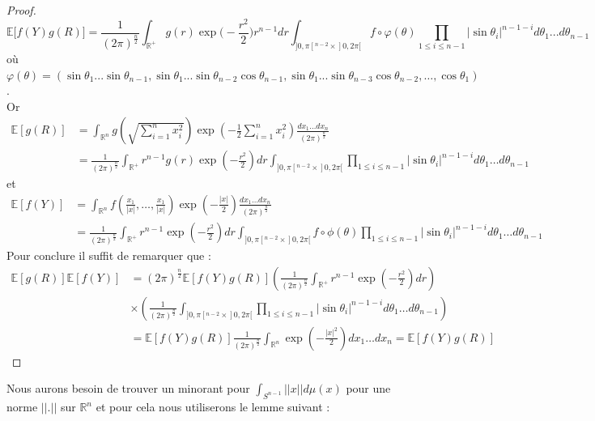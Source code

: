 \documentclass[12pt]{article}
\theoremstyle{definition}
\begin{document}
\begin{proof}
	\begin{equation*}
		\mathbb{E}\big[f(Y)g(R)\big]=\frac{1}{(2\pi)^\frac{n}{2}}\int_{\mathbb{R}^{+}}g(r) \exp\Big(-\frac{r^2}{2}\Big) r^{n-1}dr\int_{]0,\pi[^{n-2}\times ]0,2\pi[} f\circ\varphi(\theta)\prod_{1\leq i\leq n-1}|\sin\theta_i|^{n-1-i}d\theta_1 ... d\theta_{n-1}
	\end{equation*}
	où $\varphi(\theta)=(\sin \theta_1 ... \sin \theta_{n-1},\sin \theta_1 ...\sin \theta_{n-2}\cos \theta_{n-1},\sin \theta_1 ...\sin \theta_{n-3}\cos \theta_{n-2},\dots,\cos \theta_1)$.\\
	Or \begin{align*}
		\mathbb{E}[g(R)] &= \int_{\mathbb{R}^n} g\left(\sqrt{\sum_{i=1}^n x_i^2}\right) \exp\left(-\frac{1}{2}\sum_{i=1}^n x_i^2\right)\frac{dx_1\dots dx_n}{(2\pi)^\frac{n}{2}}\\
		&= \frac{1}{(2\pi)^\frac{n}{2}}\int_{\mathbb{R}^+}r^{n-1} g(r) \exp\left(-\frac{r^2}{2}\right) dr \int_{]0,\pi[^{n-2}\times ]0,2\pi[}\prod_{1\leq i\leq n-1}|\sin\theta_i|^{n-1-i}d\theta_1\dots d\theta_{n-1} 
		\end{align*} 
	et \begin{align*}
		\mathbb{E}[f(Y)] &= \int_{\mathbb{R}^n} f\left(\frac{x_1}{|x|},\dots,\frac{x_1}{|x|}\right) \exp\left(-\frac{|x|}{2}\right) \frac{dx_1\dots dx_n}{(2\pi)^\frac{n}{2}}\\
		&=  \frac{1}{(2\pi)^\frac{n}{2}}\int_{\mathbb{R}^+}r^{n-1} \exp\left(-\frac{r^2}{2}\right) dr \int_{]0,\pi[^{n-2}\times ]0,2\pi[}f\circ\phi(\theta)\prod_{1\leq i\leq n-1}|\sin\theta_i|^{n-1-i}d\theta_1\dots d\theta_{n-1} 
	\end{align*}
	Pour conclure il suffit de remarquer que :
	\begin{align*}
		\mathbb{E}[g(R)]\mathbb{E}[f(Y)] &= (2\pi)^\frac{n}{2}\mathbb{E}[f(Y)g(R)] \left(\frac{1}{(2\pi)^\frac{n}{2}}	\int_{\mathbb{R}^+}r^{n-1} \exp\left(-\frac{r^2}{2}\right) dr \right)\\ &\times \left( \frac{1}{(2\pi)^\frac{n}{2}}\int_{]0,\pi[^{n-2}\times ]0,2\pi[}\prod_{1\leq i\leq n-1}|\sin\theta_i|^{n-1-i}d\theta_1\dots d\theta_{n-1}\right)\\
		&=  \mathbb{E}[f(Y)g(R)] \frac{1}{(2\pi)^\frac{n}{2}} \int_{\mathbb{R}^n} \exp\left(-\frac{|x|^2}{2}\right) dx_1\dots dx_n = \mathbb{E}[f(Y)g(R)]
	\end{align*}
	
\end{proof} 
Nous aurons besoin de trouver un minorant pour $\int_{S^{n-1}}||x|| d\mu(x)$ pour une norme $||.||$ sur $\mathbb{R}^n$ et pour cela nous utiliserons le lemme suivant :
\end{document}
